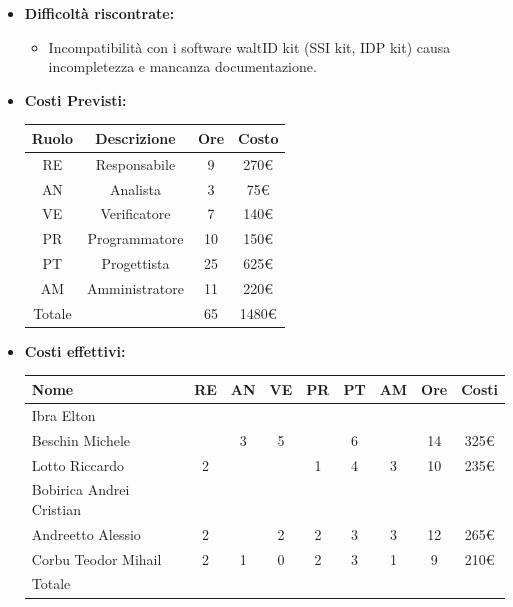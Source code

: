 \begin{itemize}
\begin{itemize}
        \end{itemize}
        \item \textbf{Difficoltà riscontrate:}
        \begin{itemize}
            \item Incompatibilità con i software waltID kit (SSI kit, IDP kit) causa incompletezza e mancanza documentazione.
        \end{itemize}
        \item \textbf{Costi Previsti:}
        \begin{longtable}{|c|c|c|c|}
            \hline
            Ruolo & Descrizione & Ore & Costo \\
            \hline
            RE & Responsabile & 9 & 270€\\
            \hline
            AN & Analista & 3 &  75€\\
            \hline
            VE & Verificatore & 7 &  140€\\
            \hline
            PR & Programmatore & 10 & 150€ \\
            \hline
            PT & Progettista & 25 &  625€\\
            \hline
            AM & Amministratore & 11 &  220€\\
            \hline
            Totale & &  65&  1480€\\
            \hline
            \end{longtable}
        \item \textbf{Costi effettivi:}
        \begin{longtable}{|p{}|c|c|c|c|c|c|c|c|}
            \hline
            Nome & RE & AN & VE & PR & PT & AM & Ore & Costi\\
            \hline
            Ibra \newline Elton & & & & & & & & \\
            \hline
            Beschin Michele & &3 & 5& & 6& & 14& 325€\\
            \hline
            Lotto \newline Riccardo & 2& & & 1& 4& 3& 10& 235€\\
            \hline
            Bobirica Andrei Cristian & & & & & & & & \\
            \hline
            Andreetto Alessio & 2& & 2& 2& 3& 3& 12& 265€\\
            \hline
            Corbu Teodor Mihail & 2& 1& 0& 2& 3& 1& 9& 210€\\
            \hline
            Totale & & & & & & & & \\
            \hline
        \end{longtable}
        \end{itemize}

